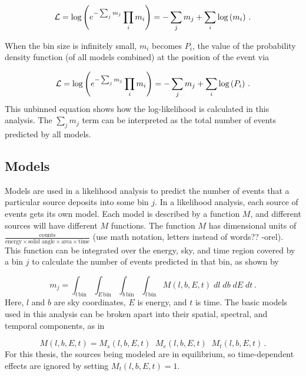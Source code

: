   \begin{equation}\label{eqn:simple_like_7}
    \mathcal{L} = \textrm{log} \left ( e^{- \sum_j m_j} \prod_i m_i \right ) = - \sum_j m_j + \sum_i \textrm{log} \left ( m_i \right ) \,.
  \end{equation}
  
  When the bin size is infinitely small, $m_i$ becomes $P_i$, the value of the probability density function (of all models combined) at the position of the event via
  
  \begin{equation}\label{eqn:simple_like_8}
    \mathcal{L} = \textrm{log} \left ( e^{- \sum_j m_j} \prod_i m_i \right ) = - \sum_j m_j + \sum_i \textrm{log} \left ( P_i \right ) \,.
  \end{equation}
  This unbinned equation shows how the log-likelihood is calculated in this analysis.
  The $\sum_{j} m_{j}$ term can be interpreted as the total number of events predicted by all models.
  
  \subsection{Models}\label{sec:model_irf_folding}
  
  Models are used in a likelihood analysis to predict the number of events that a particular source deposits into some bin $j$.
  In a likelihood analysis, each source of events gets its own model.
  Each model is described by a function $M$, and different sources will have different $M$ functions.
  The function $M$ has dimensional units of $\frac{\textrm{counts}}{\textrm{energy}\times\textrm{solid angle}\times\textrm{area}\times\textrm{time}}$ {\color{red}(use math notation, letters instead of words?? -orel)}.
  This function can be integrated over the energy, sky, and time region covered by a bin $j$ to calculate the number of events predicted in that bin, as shown by 
  
  \begin{equation}\label{eqn:model_int}
    m_{j} = \int_{t\,\textrm{bin}} \int_{E\,\textrm{bin}} \int_{b\,\textrm{bin}} \int_{l\,\textrm{bin}} M(l,b,E,t)\; dl \; db \; dE \; dt \,.
  \end{equation}
  Here, $l$ and $b$ are sky coordinates, $E$ is energy, and $t$ is time.
  The basic models used in this analysis can be broken apart into their spatial, spectral, and temporal components, as in

  \begin{equation}\label{eqn:modelparts}
    M(l,b,E,t) = M_s(l,b,E,t) \; \; M_e(l,b,E,t) \; \; M_t(l,b,E,t) \,.
  \end{equation}
  For this thesis, the sources being modeled are in equilibrium, so time-dependent effects are ignored by setting $M_{t}(l,b,E,t) = 1$.

